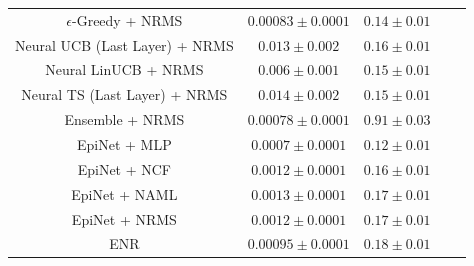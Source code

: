 \begin{table}[t!]
\begin{tabular}{ccccc}
    \midrule

  $\epsilon$-Greedy + NRMS & $0.00083 \pm 0.0001$ & $0.14 \pm 0.01$\\
    Neural UCB (Last Layer) + NRMS & $0.013 \pm 0.002$ & $0.16 \pm 0.01$\\
    Neural LinUCB + NRMS & $0.006 \pm 0.001$ & $0.15 \pm 0.01$\\
    Neural TS (Last Layer) + NRMS & $0.014 \pm 0.002$ & $0.15 \pm 0.01$\\
    Ensemble + NRMS & $0.00078 \pm 0.0001$ & $0.91 \pm 0.03$\\

    \midrule\midrule
    EpiNet + MLP & $0.0007 \pm 0.0001$ & $0.12 \pm 0.01$\\
    EpiNet + NCF & $0.0012 \pm 0.0001$ & $0.16 \pm 0.01$\\
    EpiNet + NAML & $0.0013 \pm 0.0001$ & $0.17 \pm 0.01$\\
    EpiNet + NRMS & $0.0012 \pm 0.0001$ & $0.17 \pm 0.01$\\
    \midrule
    ENR & $0.00095 \pm 0.0001$ & $0.18 \pm 0.01$\\
  \bottomrule
\end{tabular}
\vspace{-0.2in}
\end{table}

